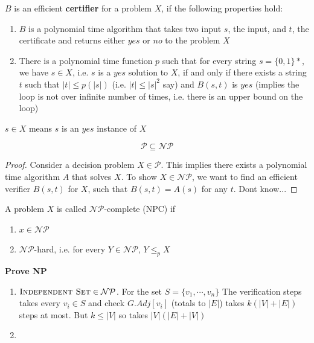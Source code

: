 \documentclass[11pt]{article}
\begin{document}
\begin{defn*}
    $B$ is an efficient \textbf{certifier} for a problem $X$, if the following properties hold:
    \begin{enumerate}
        \item $B$ is a polynomial time algorithm that takes two input $s$, the input, and $t$, the certificate and returns either $yes$ or $no$ to the problem $X$
        \item There is a polynomial time function $p$ such that for every string $s = \{ 0, 1\}*$, we have $s\in X$, i.e. $s$ is a $yes$ solution to $X$, if and only if there exists a string $t$ such that $|t| \leq p(|s|)$ (i.e. $|t| \leq |s|^2$ say) and $B(s,t)$ is $yes$ (implies the loop is not over infinite number of times, i.e. there is an upper bound on the loop)
    \end{enumerate}
    $s\in X$ means $s$ is an $yes$ instance of $X$
\end{defn*}


\begin{theorem*}
    \[
        \mathcal{P} \subseteq \mathcal{NP}
    \]
    \begin{proof}
        Consider a decision problem $X\in \mathcal{P}$. This implies there exists a polynomial time algorithm $A$ that solves $X$. To show $X\in \mathcal{NP}$, we want to find an efficient verifier $B(s,t)$ for $X$, such that $B(s,t) = A(s)$ for any $t$. Dont know...
    \end{proof}
\end{theorem*}

\begin{defn*}
    A problem $X$ is called $\mathcal{NP}$-complete (NPC) if 
    \begin{enumerate}
        \item $x\in \mathcal{NP}$
        \item $\mathcal{NP}$-hard, i.e. for every $Y\in \mathcal{NP}$, $Y\leq_p X$
    \end{enumerate}
\end{defn*}

\begin{example}
    \textbf{Prove NP}\\

    \begin{enumerate}
        \item $\textsc{Independent Set} \in \mathcal{NP}$. For the set $S = \{v_1,\cdots, v_n \}$ The verification steps takes every $v_i \in S$ and check $G.Adj[v_i]$ (totals to $|E|$) takes $k(|V| + |E|)$ steps at most. But $k\leq |V|$ so takes $|V|(|E| + |V|)$
        \item 
    \end{enumerate}
    
\end{example}
\end{document}
